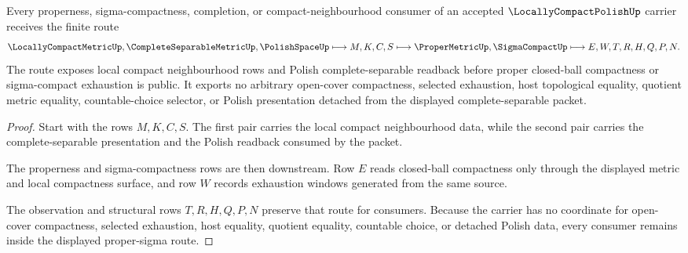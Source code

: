 \begin{theorem}
\label{thm:locally-compact-polish-proper-sigma-route}
Every properness, sigma-compactness, completion, or compact-neighbourhood consumer of an accepted $\LocallyCompactPolishUp$ carrier receives the finite route
$$
\LocallyCompactMetricUp,\CompleteSeparableMetricUp,\PolishSpaceUp
\longmapsto
M,K,C,S
\longmapsto
\ProperMetricUp,\SigmaCompactUp
\longmapsto
E,W,T,R,H,Q,P,N .
$$
The route exposes local compact neighbourhood rows and Polish complete-separable readback before proper closed-ball compactness or sigma-compact exhaustion is public. It exports no arbitrary open-cover compactness, selected exhaustion, host topological equality, quotient metric equality, countable-choice selector, or Polish presentation detached from the displayed complete-separable packet.
\end{theorem}
\begin{proof}
Start with the rows $M,K,C,S$. The first pair carries the local compact neighbourhood data, while the second pair carries the complete-separable presentation and the Polish readback consumed by the packet.

The properness and sigma-compactness rows are then downstream. Row $E$ reads closed-ball compactness only through the displayed metric and local compactness surface, and row $W$ records exhaustion windows generated from the same source.

The observation and structural rows $T,R,H,Q,P,N$ preserve that route for consumers. Because the carrier has no coordinate for open-cover compactness, selected exhaustion, host equality, quotient equality, countable choice, or detached Polish data, every consumer remains inside the displayed proper-sigma route.
\end{proof}



